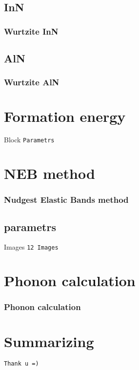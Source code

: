 \documentclass[t]{beamer}
\begin{document}
\subsection{InN}
\begin{frame}
\frametitle{Wurtzite InN}

\end{frame}

\subsection{AlN}
\begin{frame}
\frametitle{Wurtzite AlN}

\end{frame}

\section{Formation energy}

\begin{frame}
\begin{block}{Block}
\texttt{Parametrs}
\end{block}
\end{frame}

\section{NEB method}
\begin{frame}
\frametitle{Nudgest Elastic Bands method}
\end{frame}

\subsection{parametrs }
\begin{frame}
\begin{block}{Images}
\texttt{12 Images}
\end{block}
\end{frame}

\section{Phonon calculation}
\begin{frame}
\frametitle{Phonon calculation}
\end{frame}
\section{Summarizing}
\begin{frame}
\texttt{Thank u =)}
\end{frame}
\end{document}
